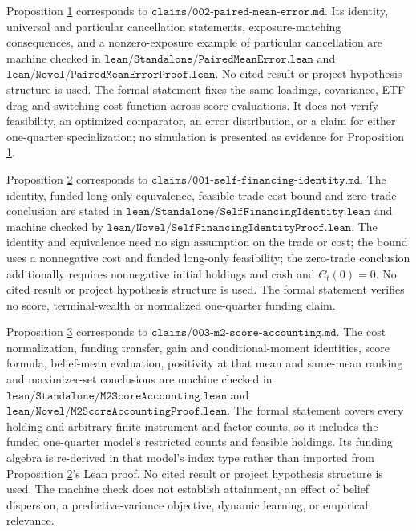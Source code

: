 \documentclass[11pt]{article}
\begin{document}
Proposition \hyperref[res:Proposition-1]{1} corresponds to \(\texttt{claims/002-paired-mean-error.md}\). Its identity,
universal and particular cancellation statements, exposure-matching consequences, and a
nonzero-exposure example of particular cancellation are machine checked in
\(\texttt{lean/Standalone/PairedMeanError.lean}\) and
\(\texttt{lean/Novel/PairedMeanErrorProof.lean}\). No cited result or project hypothesis
structure is used. The formal statement fixes the same loadings, covariance, ETF drag
and switching-cost function across score evaluations. It does not verify feasibility,
an optimized comparator, an error distribution, or a claim for either
one-quarter specialization; no simulation
is presented as evidence for Proposition \hyperref[res:Proposition-1]{1}.

Proposition \hyperref[res:Proposition-2]{2} corresponds to \(\texttt{claims/001-self-financing-identity.md}\).
The identity, funded long-only equivalence, feasible-trade cost bound and zero-trade
conclusion are stated in
\(\texttt{lean/Standalone/SelfFinancingIdentity.lean}\) and machine checked by
\(\texttt{lean/Novel/SelfFinancingIdentityProof.lean}\). The identity and equivalence
need no sign assumption on the trade or cost; the bound uses a nonnegative cost and
funded long-only feasibility; the zero-trade conclusion additionally requires
nonnegative initial holdings and cash and \(C_t(0)=0\). No cited result or project
hypothesis structure is used. The formal statement verifies no score, terminal-wealth
or normalized one-quarter funding claim.

Proposition \hyperref[res:Proposition-3]{3} corresponds to \(\texttt{claims/003-m2-score-accounting.md}\). The
cost normalization, funding transfer, gain and conditional-moment identities, score
formula, belief-mean evaluation, positivity at that mean and same-mean ranking and
maximizer-set conclusions are machine checked in
\(\texttt{lean/Standalone/M2ScoreAccounting.lean}\) and
\(\texttt{lean/Novel/M2ScoreAccountingProof.lean}\). The formal statement covers every
holding and arbitrary finite instrument and factor counts, so it includes the
funded one-quarter model's restricted counts and feasible holdings. Its funding
algebra is re-derived in that model's
index type rather than imported from Proposition \hyperref[res:Proposition-2]{2}'s Lean proof. No cited result
or project hypothesis structure is used. The machine check does not establish
attainment, an effect of belief dispersion, a predictive-variance objective,
dynamic learning, or empirical relevance.
\end{document}
